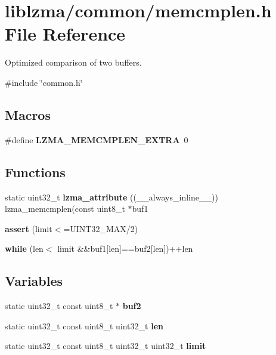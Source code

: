 \section{liblzma/common/memcmplen.h File Reference}
\label{memcmplen_8h}


Optimized comparison of two buffers.  


{\ttfamily \#include \char`\"{}common.\+h\char`\"{}}\newline
\subsection*{Macros}
\begin{DoxyCompactItemize}
\item 
\mbox{\label{memcmplen_8h_a6cf5a36dad20fbc84ea76cd650255915}} 
\#define {\bfseries L\+Z\+M\+A\+\_\+\+M\+E\+M\+C\+M\+P\+L\+E\+N\+\_\+\+E\+X\+T\+RA}~0
\end{DoxyCompactItemize}
\subsection*{Functions}
\begin{DoxyCompactItemize}
\item 
static uint32\+\_\+t \textbf{ lzma\+\_\+attribute} ((\+\_\+\+\_\+always\+\_\+inline\+\_\+\+\_\+)) lzma\+\_\+memcmplen(const uint8\+\_\+t $\ast$buf1
\item 
\mbox{\label{memcmplen_8h_a6058c38d29d04321884dade97f0003a3}} 
{\bfseries assert} (limit$<$=U\+I\+N\+T32\+\_\+\+M\+AX/2)
\item 
\mbox{\label{memcmplen_8h_ac4416a299f38e32e929eefbe84a2a037}} 
{\bfseries while} (len$<$ limit \&\&buf1[len]==buf2[len])++len
\end{DoxyCompactItemize}
\subsection*{Variables}
\begin{DoxyCompactItemize}
\item 
\mbox{\label{memcmplen_8h_ad333ab709687fb6b2f716e8a455432f3}} 
static uint32\+\_\+t const uint8\+\_\+t $\ast$ {\bfseries buf2}
\item 
\mbox{\label{memcmplen_8h_a6c4598f659398364320e3b0f357fc9be}} 
static uint32\+\_\+t const uint8\+\_\+t uint32\+\_\+t {\bfseries len}
\item 
static uint32\+\_\+t const uint8\+\_\+t uint32\+\_\+t uint32\+\_\+t {\bfseries limit}
\end{DoxyCompactItemize}


